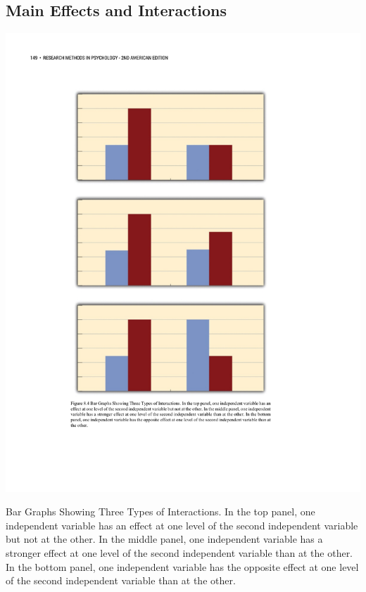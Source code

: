 \subsection{Main Effects and Interactions}

\begin{marginfigure}[0in]

\includegraphics[width=\linewidth]{figures/C8interactionbars.pdf}

\caption{Bar Graphs Showing Three Types of Interactions. In the top panel, one independent variable has an effect at one level of the second independent variable but not at the other. In the middle panel, one independent variable has a stronger effect at one level of the second independent variable than at the other. In the bottom panel, one independent variable has the opposite effect at one level of the second independent variable than at the other.}

\label{fig:interactionbars}

\end{marginfigure}

